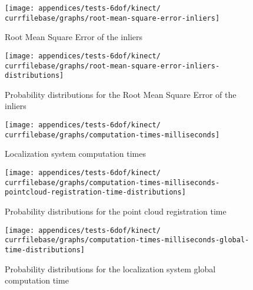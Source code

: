 \begin{figure}[H]
	\centering
	\texttt{[image: appendices/tests-6dof/kinect/\\currfilebase/graphs/root-mean-square-error-inliers]}
	\caption{Root Mean Square Error of the inliers}
\end{figure}

\begin{figure}[H]
	\centering
	\texttt{[image: appendices/tests-6dof/kinect/\\currfilebase/graphs/root-mean-square-error-inliers-distributions]}
	\caption{Probability distributions for the Root Mean Square Error of the inliers}
\end{figure}


\begin{figure}[H]
	\centering
	\texttt{[image: appendices/tests-6dof/kinect/\\currfilebase/graphs/computation-times-milliseconds]}
	\caption{Localization system computation times}
\end{figure}

\begin{figure}[H]
	\centering
	\texttt{[image: appendices/tests-6dof/kinect/\\currfilebase/graphs/computation-times-milliseconds-pointcloud-registration-time-distributions]}
	\caption{Probability distributions for the point cloud registration time}
\end{figure}

\begin{figure}[H]
	\centering
	\texttt{[image: appendices/tests-6dof/kinect/\\currfilebase/graphs/computation-times-milliseconds-global-time-distributions]}
	\caption{Probability distributions for the localization system global computation time}
\end{figure}
